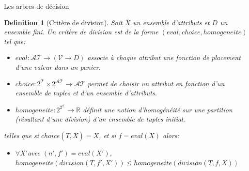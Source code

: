 \documentclass[a4paper, 11pt]{report}
\newtheorem{definition}{Definition}
\newcommand{\set}[1]{\ensuremath{\overline{#1}}}
\newcommand{\tupleset}{\ensuremath{\mathcal{T}}}
\newcommand{\attributset}{\ensuremath{\mathcal{AT}}}
\newcommand{\valeurset}{\ensuremath{\mathcal{V}}}
\newcommand{\real}{\ensuremath{\mathbb{R}}}
\begin{document}
\begin{chapter}{Les arbres de décision}
\begin{definition}[Critère de division]
Soit $\set{X}$ un ensemble d'attributs et $D$ un ensemble fini.
Un critère de division est de la forme $(eval,choice,homogeneite)$ tel que:
\begin{itemize}
\item $eval: \attributset\rightarrow (\valeurset\rightarrow D)$ associe à chaque attribut une fonction de placement d'une valeur dans un panier.
\item $choice: 2^\tupleset\times 2^\attributset \rightarrow \attributset$ permet de choisir un attribut en fonction d'un ensemble de tuples et d'un ensemble d'attributs.
\item $homogeneite: 2^{2^\tupleset}\rightarrow\real$ définit une notion d'homogénéité sur une partition (résultant d'une division) d'un ensemble de tuples initial.
\end{itemize}
telles que si $choice(T,\set{X}) = X$, et si $f = eval(X)$  alors:
\begin{itemize}
\item $\forall X' $avec $(n',f')=eval(X')$, $homogeneite(division(T,f',X')) \leq homogeneite(division(T,f,X))$
\end{itemize}




\end{definition}


\end{chapter}
\end{document}
